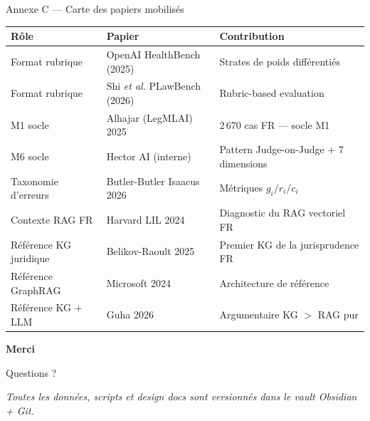 \documentclass[aspectratio=169,10pt]{beamer}
\begin{document}
\begin{frame}{Annexe C --- Carte des papiers mobilisés}
  \footnotesize
  \begin{tabular}{@{}p{2.8cm} p{4.5cm} p{6.5cm}@{}}
    \toprule
    \textbf{Rôle} & \textbf{Papier} & \textbf{Contribution} \\
    \midrule
    Format rubrique        & OpenAI HealthBench (2025)       & Strates de poids différentiés \\
    Format rubrique        & Shi \textit{et al.} PLawBench (2026) & Rubric-based evaluation \\
    M1 socle               & Alhajar (LegMLAI) 2025         & 2\,670 cas FR --- socle M1 \\
    M6 socle               & Hector AI (interne)             & Pattern Judge-on-Judge + 7 dimensions \\
    Taxonomie d'erreurs    & Butler-Butler Isaacus 2026      & Métriques $g_i / r_i / c_i$ \\
    Contexte RAG FR        & Harvard LIL 2024                & Diagnostic du RAG vectoriel FR \\
    Référence KG juridique & Belikov-Raoult 2025             & Premier KG de la jurisprudence FR \\
    Référence GraphRAG     & Microsoft 2024                  & Architecture de référence \\
    Référence KG + LLM     & Guha 2026                       & Argumentaire KG $>$ RAG pur \\
    \bottomrule
  \end{tabular}
\end{frame}

\begin{frame}
  \begin{center}
    \vspace{1em}
    {\Huge \textbf{Merci}}

    \vspace{1em}
    {\Large Questions ?}

    \vspace{2em}
    \footnotesize\textit{Toutes les données, scripts et design docs sont versionnés dans le vault Obsidian + Git.}
  \end{center}
\end{frame}
\end{document}
